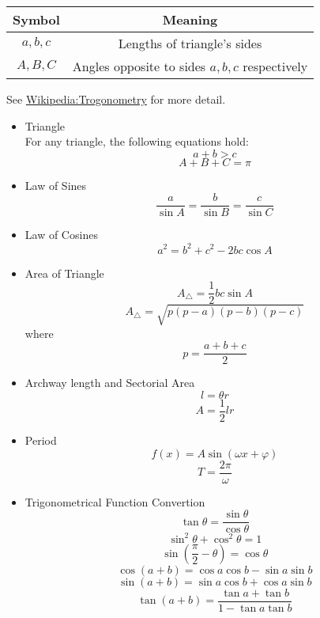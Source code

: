 \begin{table}[!h]
 \begin{center}
 \begin{tabular}{|c|c|}
 \hline
 Symbol & Meaning \\
 \hline\hline
 $a,b,c$ & Lengths of triangle's sides\\
 $A,B,C$ & Angles opposite to sides $a,b,c$ respectively\\
 \hline
 \end{tabular}
 \end{center}
\end{table}

 See \href{https://en.wikipedia.org/wiki/Trigonometry}
 {Wikipedia:Trogonometry} for more detail.

\begin{itemize}
\item{Triangle}\\
 For any triangle, the following equations hold:
 \[ a + b > c \]
 \[ A + B + C = \pi \]
\item{Law of Sines}\\
  \begin{equation}
  \frac{a}{\sin A} = \frac{b}{\sin B} = \frac{c}{\sin C} 
  \end{equation}
\item{Law of Cosines}\\
  \begin{equation}
  a^2 = b^2 + c^2 - 2 b c \cos A
  \end{equation}
\item{Area of Triangle}\\
  \begin{equation}
  A_\triangle = \frac{1}{2} bc \sin A
  \end{equation}
  \begin{equation}
  A_\triangle = \sqrt{p(p-a)(p-b)(p-c)}
  \end{equation}
  where
  \[ p = \frac{a+b+c}{2} \]
\item{Archway length and Sectorial Area}\\
  \begin{equation}
  l = \theta r
  \end{equation}
  \begin{equation}
  A = \frac{1}{2} l r
  \end{equation}
\item{Period}\\
  \[ f(x) = A \sin (\omega x + \varphi) \]
  \[ T = \frac{2\pi}{\omega} \]
\item{Trigonometrical Function Convertion}\\
  \[ \tan \theta = \frac{\sin \theta}{\cos \theta}\]
  \[ \sin^2 \theta + \cos^2 \theta = 1 \]
  \[ \sin (\frac{\pi}{2} - \theta) = \cos \theta \]
  \[ \cos (a+b) = \cos a \cos b - \sin a \sin b \]
  \[ \sin (a+b) = \sin a \cos b + \cos a \sin b \]
  \[ \tan (a+b) = \frac{\tan a + \tan b}{1 - \tan a \tan b} \]


\end{itemize}
